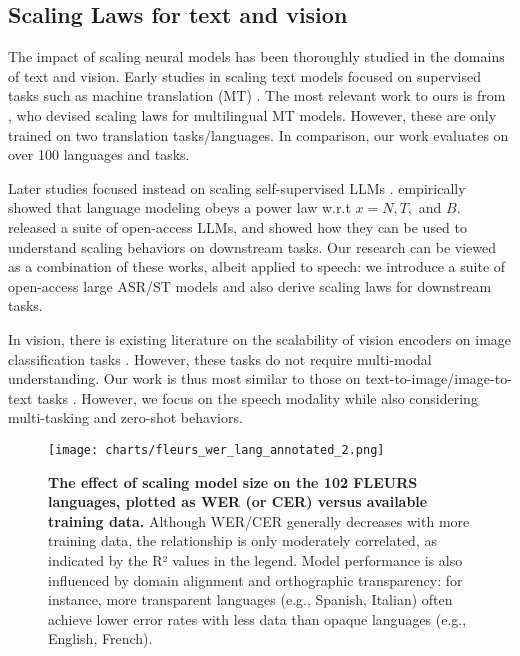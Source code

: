 \vspace{-0.2cm}
\subsection{Scaling Laws for text and vision}
\vspace{-0.2cm}

The impact of scaling neural models has been thoroughly studied in the domains of text and vision. Early studies in scaling text models focused on supervised tasks such as machine translation (MT) \cite{gordon-etal-2021-data, ghorbani2022scaling}. The most relevant work to ours is from \citet{scalingMNMT}, who devised scaling laws for multilingual MT models. However, these are only trained on two translation tasks/languages. In comparison, our work evaluates on over 100 languages and tasks.

Later studies focused instead on scaling self-supervised LLMs \cite{pythia, tay-etal-2023-scaling, kaplan2020scaling}. \citet{kaplan2020scaling} empirically showed that language modeling obeys a power law w.r.t $x = N, T,$ and $B$. \citet{pythia} released a suite of open-access LLMs, and showed how they can be used to understand scaling behaviors on downstream tasks. Our research can be viewed as a combination of these works, albeit applied to speech: we introduce a suite of open-access large ASR/ST models and also derive scaling laws for downstream tasks.

In vision, there is existing literature on the scalability of vision encoders on image classification tasks \cite{zhai2022scaling}. However, these tasks do not require multi-modal understanding. Our work is thus most similar to those on text-to-image/image-to-text tasks \cite{henighan2020scaling}. However, we focus on the speech modality while also considering multi-tasking and zero-shot behaviors.

\begin{figure*}
    \centering
    \texttt{[image: charts/fleurs\_wer\_lang\_annotated\_2.png]}
    \vspace{-0.3cm}
    \caption{
    \textbf{The effect of scaling model size on the 102 FLEURS languages, plotted as WER (or CER) versus available training data.} Although WER/CER generally decreases with more training data, the relationship is only moderately correlated, as indicated by the R² values in the legend. Model performance is also influenced by domain alignment and orthographic transparency: for instance, more transparent languages (e.g., Spanish, Italian) often achieve lower error rates with less data than opaque languages (e.g., English, French).
    }
    \vspace{-0.3cm}
    \label{fig:multilingual_param}
\end{figure*}
\vspace{-0.1cm}
